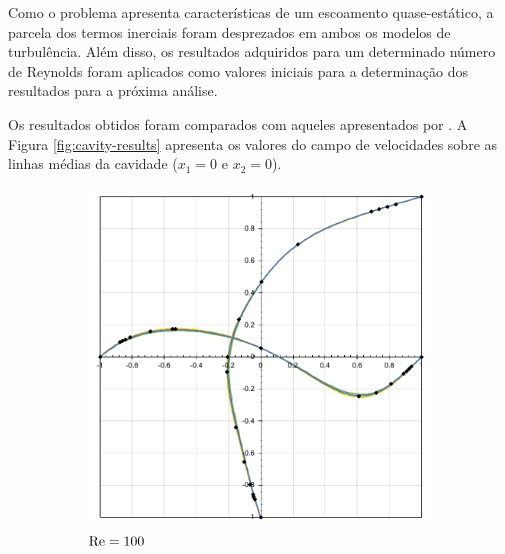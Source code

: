 Como o problema apresenta características de um escoamento quase-estático, a parcela dos termos inerciais foram desprezados em ambos os modelos de turbulência. Além disso, os resultados adquiridos para um determinado número de Reynolds foram aplicados como valores iniciais para a determinação dos resultados para a próxima análise.

Os resultados obtidos foram comparados com aqueles apresentados por . A Figura \ref{fig:cavity-results} apresenta os valores do campo de velocidades sobre as linhas médias da cavidade ($x_1=0$ e $x_2=0$).

\begin{figure}[h!]
    \centering
    \caption{Valores do campo de velocidades sobre as linhas médias da cavidade.}
    \begin{subfigure}{0.4\textwidth}
        \includegraphics[width=\linewidth]{Figuras/Cavity/Re100.pdf}
        \caption{$\mathrm{Re}=100$}
    \end{subfigure}
    \begin{subfigure}{0.4\textwidth}

\end{subfigure}
\end{figure}
